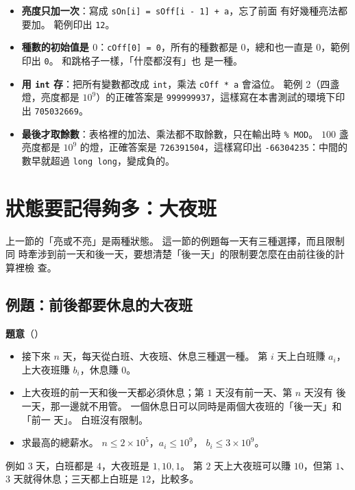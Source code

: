 \begin{itemize}
\item \textbf{亮度只加一次}：寫成 \texttt{sOn[i] = sOff[i - 1] + a}，忘了前面
有好幾種亮法都要加。 範例印出 \texttt{12}。
\item \textbf{種數的初始值是 $0$}：\texttt{cOff[0] = 0}，所有的種數都是
$0$，總和也一直是 $0$，範例印出 \texttt{0}。 和跳格子一樣，「什麼都沒有」也
是一種。
\item \textbf{用 \texttt{int} 存}：把所有變數都改成 \texttt{int}，乘法
\texttt{cOff * a} 會溢位。 範例 2（四盞燈，亮度都是 $10^9$）的正確答案是
\texttt{999999937}，這樣寫在本書測試的環境下印出 \texttt{705032669}。
\item \textbf{最後才取餘數}：表格裡的加法、乘法都不取餘數，只在輸出時
\texttt{\% MOD}。 $100$ 盞亮度都是 $10^9$ 的燈，正確答案是
\texttt{726391504}，這樣寫印出 \texttt{-66304235}：中間的數早就超過
\texttt{long long}，變成負的。
\end{itemize}

\section{狀態要記得夠多：大夜班}
\label{sec:dp1-three}

上一節的「亮或不亮」是兩種狀態。 這一節的例題每一天有三種選擇，而且限制同
時牽涉到前一天和後一天，要想清楚「後一天」的限制要怎麼在由前往後的計算裡檢
查。

\subsection{例題：前後都要休息的大夜班}
\label{sec:ex-night}

\textbf{題意}（）

\begin{itemize}
\item 接下來 $n$ 天，每天從白班、大夜班、休息三種選一種。 第 $i$ 天上白班賺
$a_i$，上大夜班賺 $b_i$，休息賺 $0$。
\item 上大夜班的前一天和後一天都必須休息；第 $1$ 天沒有前一天、第 $n$ 天沒有
後一天，那一邊就不用管。 一個休息日可以同時是兩個大夜班的「後一天」和「前一
天」。 白班沒有限制。
\item 求最高的總薪水。 $n \le 2 \times 10^5$，$a_i \le 10^9$，
$b_i \le 3 \times 10^9$。
\end{itemize}

例如 $3$ 天，白班都是 $4$，大夜班是 $1, 10, 1$。 第 $2$ 天上大夜班可以賺
$10$，但第 $1$、$3$ 天就得休息；三天都上白班是 $12$，比較多。

